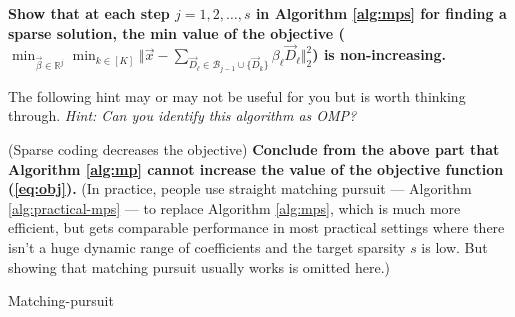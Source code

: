 \documentclass[preview]{standalone}
\begin{document}
\begin{Parts}
	 
	
	\Part
	{\bf Show that at each step $j=1, 2, \ldots, s$ in Algorithm \ref{alg:mps} for finding
		a sparse solution, the min value of the objective 
		($\min_{\vec \beta\in\mathbb{R}^j}\min_{k \in [K]} \Vert \vec x - \sum_{ \vec D_\ell \in \mathcal{B}_{j-1} \cup \{ \vec D_k\}} \beta_\ell  \vec D_\ell \Vert^2_2$)
		is non-increasing.}
	
	The following hint may or may not be useful for you but is
        worth thinking through.
	{\em Hint: Can you identify this algorithm as OMP? }
	
	
	
	\Part (Sparse coding decreases the objective) {\bf Conclude from the above
		part that Algorithm \ref{alg:mp} cannot increase the value of the objective
		function (\ref{eq:obj}).} (In practice, people use straight matching
	pursuit --- Algorithm \ref{alg:practical-mps} --- to replace Algorithm \ref{alg:mps}, which is
	much more efficient, but gets comparable performance in most practical
	settings where there isn't a huge dynamic range of coefficients and
	the target sparsity $s$ is low. But showing that matching
        pursuit usually works is omitted here.)
	
	
	
	\begin{algorithm}
		\caption{Matching-pursuit}
		\label{alg:practical-mps}
		\SetAlgoLined
		
\end{algorithm}
\end{Parts}
\end{document}
